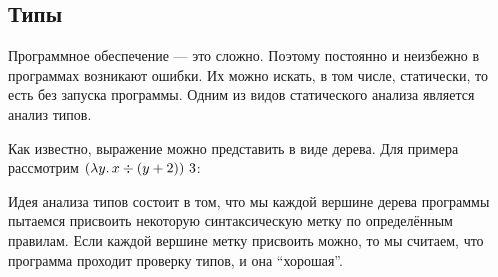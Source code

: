 \documentclass[12pt]{article}
\newcommand{\ap}{~}
\begin{document}
    \subsection{Типы}

    Программное обеспечение --- это сложно.
    Поэтому постоянно и неизбежно в программах возникают ошибки.
    Их можно искать, в том числе, статически, то есть без запуска программы.
    Одним из видов статического анализа является анализ типов.

    Как известно, выражение можно представить в виде дерева.
    Для примера рассмотрим $(\lambda y\ldotp x \div (y + 2)) \ap 3$:
    \\
    \begin{figure}[h]
        \centering
    \end{figure}

    Идея анализа типов состоит в том, что мы каждой вершине дерева программы пытаемся присвоить некоторую синтаксическую метку по определённым правилам.
    Если каждой вершине метку присвоить можно, то мы считаем, что программа проходит проверку типов, и она ``хорошая''.
\end{document}
